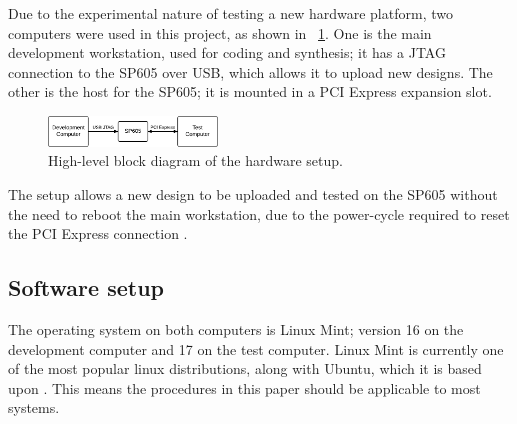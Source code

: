 Due to the experimental nature of testing a new hardware platform, two computers were used in this project, as shown in \figurename~\ref{fig:hardware-setup}.
One is the main development workstation, used for coding and synthesis; it has a JTAG connection to the SP605 over USB, which allows it to upload new designs.
The other is the host for the SP605; it is mounted in a PCI Express expansion slot.

\begin{figure}[!ht]
    \centering
    \includegraphics[width=0.40\textwidth]{figures/hardware-setup}
    \caption{High-level block diagram of the hardware setup.}
    \label{fig:hardware-setup}
\end{figure}

The setup allows a new design to be uploaded and tested on the SP605 without the need to reboot the main workstation, due to the power-cycle required to reset the PCI Express connection \CN.

\TODO

\subsection{Software setup}

The operating system on both computers is Linux Mint; version 16 on the development computer and 17 on the test computer.
Linux Mint is currently one of the most popular linux distributions, along with Ubuntu, which it is based upon \cite{distrowatch}.
This means the procedures in this paper should be applicable to most systems.




